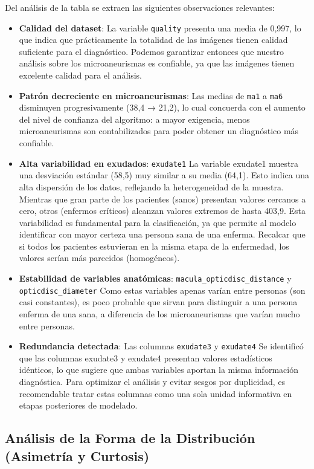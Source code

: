Del análisis de la tabla se extraen las siguientes observaciones relevantes:

\begin{itemize}
    \item \textbf{Calidad del dataset}: La variable \texttt{quality} presenta una media de 0,997, lo que indica que prácticamente la totalidad de las imágenes tienen calidad suficiente para el diagnóstico. Podemos garantizar entonces que nuestro análisis sobre los microaneurismas es confiable, ya que las imágenes tienen excelente calidad para el análisis. 
    \item \textbf{Patrón decreciente en microaneurismas}: Las medias de \texttt{ma1} a \texttt{ma6} disminuyen progresivamente (38,4 → 21,2), lo cual concuerda con el aumento del nivel de confianza del algoritmo: a mayor exigencia, menos microaneurismas son contabilizados para poder obtener un diagnóstico más confiable.
    \item \textbf{Alta variabilidad en exudados}: \texttt{exudate1} La variable exudate1 muestra una desviación estándar (58,5) muy similar a su media (64,1). Esto indica una alta dispersión de los datos, reflejando la heterogeneidad de la muestra. Mientras que gran parte de los pacientes (sanos) presentan valores cercanos a cero, otros (enfermos críticos) alcanzan valores extremos de hasta 403,9. Esta variabilidad es fundamental para la clasificación, ya que permite al modelo identificar con mayor certeza una persona sana de una enferma. Recalcar que si todos los pacientes estuvieran en la misma etapa de la enfermedad, los valores serían más parecidos (homogéneos).
    \item \textbf{Estabilidad de variables anatómicas}: \texttt{macula\_opticdisc\_distance} y \texttt{opticdisc\_diameter} Como estas variables apenas varían entre personas (son casi constantes), es poco probable que sirvan para distinguir a una persona enferma de una sana, a diferencia de los microaneurismas que varían mucho entre personas.
    \item \textbf{Redundancia detectada}: Las columnas \texttt{exudate3} y \texttt{exudate4} Se identificó que las columnas exudate3 y exudate4 presentan valores estadísticos idénticos, lo que sugiere que ambas variables aportan la misma información diagnóstica. Para optimizar el análisis y evitar sesgos por duplicidad, es recomendable tratar estas columnas como una sola unidad informativa en etapas posteriores de modelado.
\end{itemize}

\subsection{Análisis de la Forma de la Distribución (Asimetría y Curtosis)}


